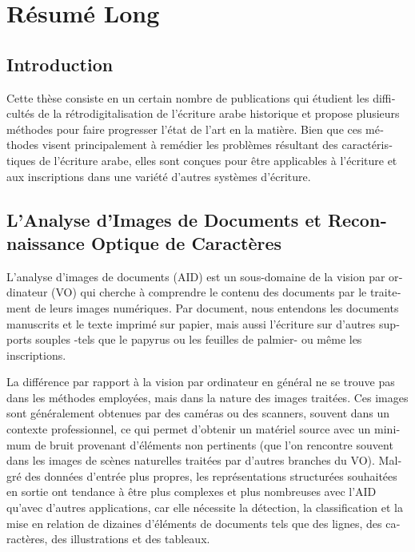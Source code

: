 \chapter{Résumé Long}

\begin{french}

\section{Introduction}

Cette thèse consiste en un certain nombre de publications qui étudient les
difficultés de la rétrodigitalisation de l'écriture arabe historique et propose
plusieurs méthodes pour faire progresser l'état de l'art en la matière. Bien
que ces méthodes visent principalement à remédier les problèmes résultant des
caractéristiques de l'écriture arabe, elles sont conçues pour être applicables
à l'écriture et aux inscriptions dans une variété d'autres systèmes d'écriture.

\section{L'Analyse d'Images de Documents et Reconnaissance Optique de Caractères}
L'analyse d'images de documents (AID) est un sous-domaine de la vision par
ordinateur (VO) qui cherche à comprendre le contenu des documents par
le traitement de leurs images numériques. Par document, nous entendons les
documents manuscrits et le texte imprimé sur papier, mais aussi
l'écriture sur d'autres supports souples -tels que le papyrus ou les
feuilles de palmier- ou même les inscriptions.

La différence par rapport à la vision par ordinateur en général ne se trouve pas
dans les méthodes employées, mais dans la nature des images traitées.
Ces images sont généralement obtenues par des caméras ou des scanners,
souvent dans un contexte professionnel, ce qui permet d'obtenir un
matériel source avec un minimum de bruit provenant d'éléments non
pertinents (que l'on rencontre souvent dans les images de scènes
naturelles traitées par d'autres branches du VO). Malgré des données d'entrée
plus propres, les représentations structurées souhaitées en sortie ont
tendance à être plus complexes et plus nombreuses avec l'AID qu'avec 
d'autres applications, car elle nécessite la détection, la classification et
la mise en relation de dizaines d'éléments de documents tels que des
lignes, des caractères, des illustrations et des tableaux.


\end{french}

